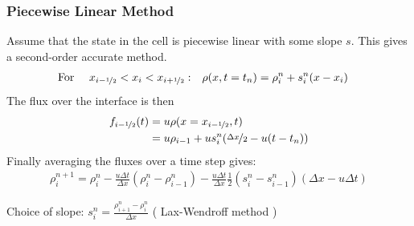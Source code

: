
\begin{frame}
	\frametitle{Piecewise Linear Method}

		Assume that the state in the cell is piecewise linear with some slope $s$. This gives a second-order accurate method.
		\begin{align*}
			\text{For } && x_{i-\half} < x_i < x_{i+\half}: &
			\quad \rho(x, t=t_n) = \rho_i^n + s_i^n(x - x_i)%
		\end{align*}
%		
		The flux over the interface is then
%
		\begin{align*}
			f_{i-\nicefrac{1}{2}}(t) 	&= u \rho(x = x_{i-\nicefrac{1}{2}}, t)\\
						&= u \rho_{i-1} +  u s_i^n(\nicefrac{\Delta x}{2} - u(t-t_n))
		\end{align*}
%
		Finally averaging the fluxes over a time step gives:
		\begin{align*}
			\rho_i^{n+1} = \rho_i^n - \frac{u \Delta t}{\Delta x} ( \rho_i ^n - \rho_{i-1}^n) - \frac{u \Delta t}{\Delta x} \frac{1}{2} (s_i^n - s_{i-1}^n)(\Delta x - u\Delta t)
		\end{align*}
		
		Choice of slope: $s_i^n = \frac{\rho_{i+1}^n - \rho_i^n}{\Delta x}$ ( Lax-Wendroff method )

\end{frame}









